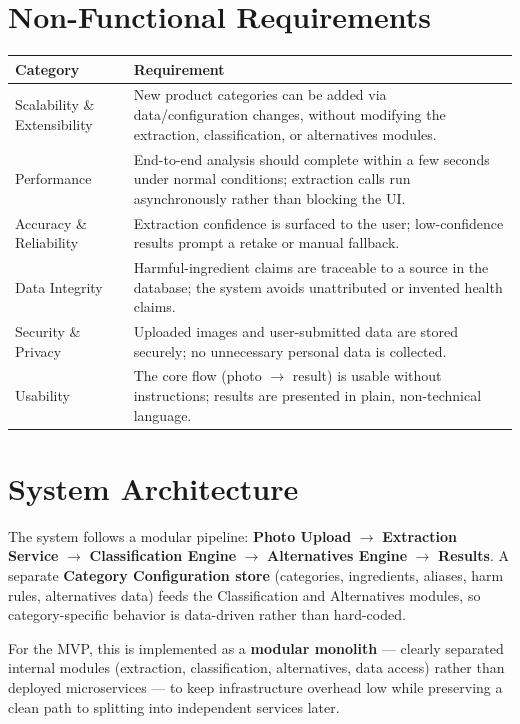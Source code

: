 \documentclass[11pt,a4paper]{article}
\begin{document}
\section{Non-Functional Requirements}

\begin{longtable}{@{}p{3.4cm}p{10.2cm}@{}}
\toprule
\textbf{Category} & \textbf{Requirement} \\
\midrule
\endhead
Scalability \& Extensibility & New product categories can be added via data/configuration changes, without modifying the extraction, classification, or alternatives modules. \\
Performance & End-to-end analysis should complete within a few seconds under normal conditions; extraction calls run asynchronously rather than blocking the UI. \\
Accuracy \& Reliability & Extraction confidence is surfaced to the user; low-confidence results prompt a retake or manual fallback. \\
Data Integrity & Harmful-ingredient claims are traceable to a source in the database; the system avoids unattributed or invented health claims. \\
Security \& Privacy & Uploaded images and user-submitted data are stored securely; no unnecessary personal data is collected. \\
Usability & The core flow (photo $\rightarrow$ result) is usable without instructions; results are presented in plain, non-technical language. \\
\bottomrule
\end{longtable}

\section{System Architecture}
The system follows a modular pipeline: \textbf{Photo Upload} $\rightarrow$ \textbf{Extraction Service} $\rightarrow$ \textbf{Classification Engine} $\rightarrow$ \textbf{Alternatives Engine} $\rightarrow$ \textbf{Results}. A separate \textbf{Category Configuration store} (categories, ingredients, aliases, harm rules, alternatives data) feeds the Classification and Alternatives modules, so category-specific behavior is data-driven rather than hard-coded.

For the MVP, this is implemented as a \textbf{modular monolith} --- clearly separated internal modules (extraction, classification, alternatives, data access) rather than deployed microservices --- to keep infrastructure overhead low while preserving a clean path to splitting into independent services later.
\end{document}
